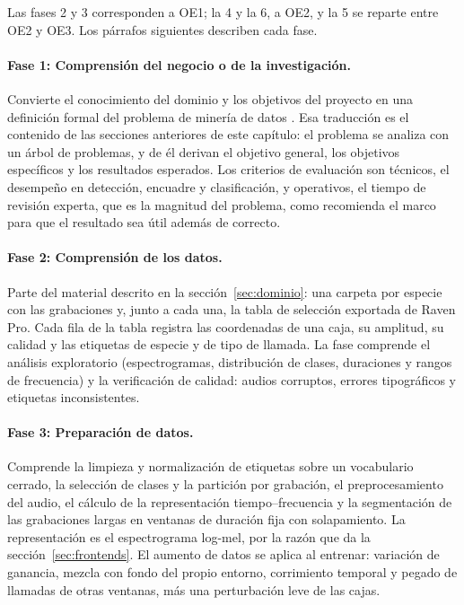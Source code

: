 Las fases 2 y 3 corresponden a OE1; la 4 y la 6, a OE2, y la 5 se reparte entre
OE2 y OE3. Los párrafos siguientes describen cada fase.

\paragraph{Fase 1: Comprensión del negocio o de la investigación.}
Convierte el conocimiento del dominio y los objetivos del proyecto en una
definición formal del problema de minería de datos
\citep{chapman_crisp-dm_2000}. Esa traducción es el contenido de las secciones
anteriores de este capítulo: el problema se analiza con un árbol de problemas, y
de él derivan el objetivo general, los objetivos específicos y los resultados
esperados. Los criterios de evaluación son técnicos, el desempeño en detección,
encuadre y clasificación, y operativos, el tiempo de revisión experta, que es la
magnitud del problema, como recomienda el marco para que el resultado sea útil
además de correcto.

\paragraph{Fase 2: Comprensión de los datos.}
\label{sec:fase2}
Parte del material descrito en la sección~\ref{sec:dominio}: una carpeta por
especie con las grabaciones y, junto a cada una, la tabla de selección exportada
de Raven Pro. Cada fila de la tabla registra las coordenadas de una caja, su
amplitud, su calidad y las etiquetas de especie y de tipo de llamada. La fase
comprende el análisis exploratorio (espectrogramas, distribución de clases,
duraciones y rangos de frecuencia) y la verificación de calidad: audios
corruptos, errores tipográficos y etiquetas inconsistentes.

\paragraph{Fase 3: Preparación de datos.}
\label{sec:fase3}
Comprende la limpieza y normalización de etiquetas sobre un vocabulario cerrado,
la selección de clases y la partición por grabación, el preprocesamiento del
audio, el cálculo de la representación tiempo--frecuencia y la segmentación de
las grabaciones largas en ventanas de duración fija con solapamiento. La
representación es el espectrograma log-mel, por la razón que da la
sección~\ref{sec:frontends}. El aumento de
datos se aplica al entrenar: variación de ganancia, mezcla con fondo del propio
entorno, corrimiento temporal y pegado de llamadas de otras ventanas, más una
perturbación leve de las cajas.

